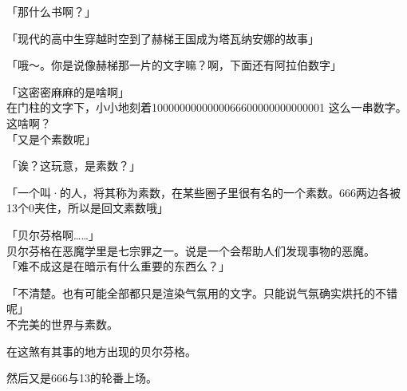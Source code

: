 「那什么书啊？」

「现代的高中生穿越时空到了赫梯王国成为塔瓦纳安娜的故事」

「哦～。你是说像赫梯那一片的文字嘛？啊，下面还有阿拉伯数字」

「这密密麻麻的是啥啊」\\

在门柱的文字下，小小地刻着1000000000000066600000000000001 这么一串数字。这啥啊？\\

「又是个素数呢」

「诶？这玩意，是素数？」

「一个叫·的人，将其称为素数，在某些圈子里很有名的一个素数。666两边各被13个0夹住，所以是回文素数哦」

「贝尔芬格啊……」\\

贝尔芬格在恶魔学里是七宗罪之一。说是一个会帮助人们发现事物的恶魔。\\

「难不成这是在暗示有什么重要的东西么？」

「不清楚。也有可能全部都只是渲染气氛用的文字。只能说气氛确实烘托的不错呢」\\

不完美的世界与素数。

在这煞有其事的地方出现的贝尔芬格。

然后又是666与13的轮番上场。\\

